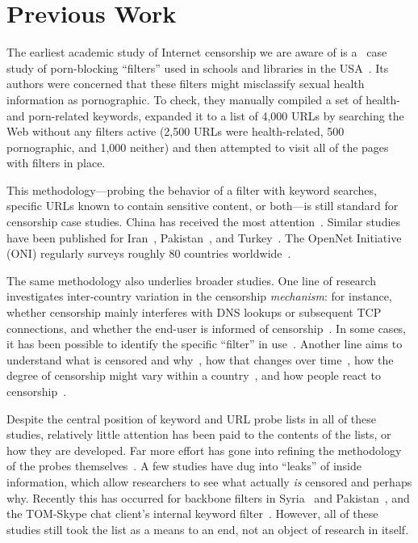 \section{Previous Work}\label{s:prev-work}

The earliest academic study of Internet censorship we are aware of is
a~\citeyear{richardson2002us.health} case study of porn-blocking
“filters” used in schools and libraries in the
USA~\cite{richardson2002us.health}.  Its authors were concerned that
these filters might misclassify sexual health information as
pornographic.  To check, they manually compiled a set of health- and
porn-related keywords, expanded it to a list of 4,000 URLs by
searching the Web without any filters active (2,500 URLs were
health-related, 500 pornographic, and 1,000 neither) and then
attempted to visit all of the pages with filters in place.

This methodology---probing the behavior of a filter with keyword
searches, specific URLs known to contain sensitive content, or
both---is still standard for censorship case studies.  China has
received the most attention~\cite{clayton2006cn.ignore,
  park2010cn.filter, xu2011cn.where, anderson2012cn.splinternet,
  wright2014cn.regional}. Similar studies have been published for
Iran~\cite{aryan2013ir.first}, Pakistan~\cite{nabi2013pk.anatomy,
  nabi2014.futile}, and Turkey~\cite{nabi2014.futile}.  The OpenNet
Initiative (ONI) regularly surveys roughly 80 countries
worldwide~\cite{oni.nd.profiles, oni2008denied, oni2010controlled}.

The same methodology also underlies broader studies.  One line of
research investigates inter-country variation in the censorship
\emph{mechanism}: for instance, whether censorship mainly interferes
with DNS lookups or subsequent TCP connections, and whether the
end-user is informed of censorship~\cite{verkamp2012.mechanics}. In
some cases, it has been possible to identify the specific “filter” in
use~\cite{dalek2013.url.filtering, jones.2014.blockpages}. Another
line aims to understand what is censored and
why~\cite{aase2012whiskey}, how that changes over
time~\cite{anderson2014.ripe,gill.2015.worldwide}, how the degree of
censorship might vary within a country~\cite{wright2011.finegrain},
and how people react to
censorship~\cite{khattak.2014.isp,knockel.2011.skype}.

Despite the central position of keyword and URL probe lists in all of
these studies, relatively little attention has been paid to the
contents of the lists, or how they are developed.  Far more effort has
gone into refining the methodology of the probes
themselves~\cite{dalek2013.url.filtering, dischinger2010.diffserv,
  filasto2012.ooni, jones.2014.blockpages, sfakianakis2011.censmon,
  wright2011.finegrain, verkamp2012.mechanics, burnett2015.encore}.
A few studies have dug into “leaks” of inside information, which allow
researchers to see what actually \emph{is} censored and perhaps why.
Recently this has occurred for backbone filters in
Syria~\cite{chaabane.2014.syria} and Pakistan~\cite{khattak.2014.isp},
and the TOM-Skype chat client's internal keyword
filter~\cite{knockel.2011.skype}.  However, all of these studies still
took the list as a means to an end, not an object of research in
itself.

